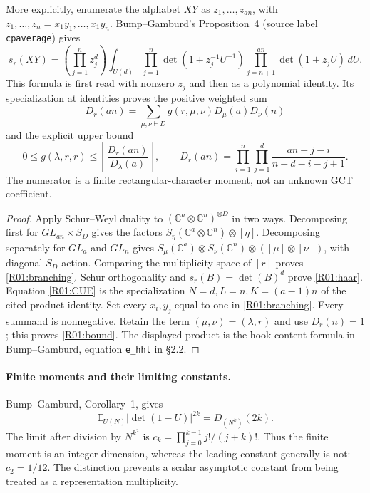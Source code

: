 \documentclass[11pt,a4paper]{article}
\theoremstyle{definition}\newtheorem{definition}{Definition}
\begin{document}
More explicitly, enumerate the alphabet $XY$ as $z_1,\ldots,z_{an}$, with
$z_1,\ldots,z_n=x_1y_1,\ldots,x_1y_n$. Bump--Gamburd's Proposition~4
(source label \nolinkurl{cpaverage}) gives
\begin{equation}\label{R01:CUE}
 s_r(XY)=\left(\prod_{j=1}^n z_j^d\right)
 \int_{U(d)}\prod_{j=1}^n\det(1+z_j^{-1}U^{-1})
 \prod_{j=n+1}^{an}\det(1+z_jU)\,dU.
\end{equation}
This formula is first read with nonzero $z_j$ and then as a polynomial identity.
Its specialization at identities proves the positive weighted sum
\begin{equation}\label{R01:dimension}
 D_r(an)=\sum_{\mu,\nu\vdash D}
 g(r,\mu,\nu)D_\mu(a)D_\nu(n)
\end{equation}
and the explicit upper bound
\begin{equation}\label{R01:bound}
 0\leq g(\lambda,r,r)\leq
 \left\lfloor\frac{D_r(an)}{D_\lambda(a)}\right\rfloor,
 \qquad
 D_r(an)=\prod_{i=1}^{n}\prod_{j=1}^{d}
 \frac{an+j-i}{n+d-i-j+1}.
\end{equation}
The numerator is a finite rectangular-character moment, not an unknown GCT
coefficient.

\begin{proof}
Apply Schur--Weyl duality to $(\mathbb C^a\otimes\mathbb C^n)^{\otimes D}$
in two ways. Decomposing first for $GL_{an}\times S_D$ gives the factors
$S_\eta(\mathbb C^a\otimes\mathbb C^n)\otimes[\eta]$.
Decomposing separately for $GL_a$ and $GL_n$ gives
$S_\mu(\mathbb C^a)\otimes S_\nu(\mathbb C^n)\otimes
([\mu]\otimes[\nu])$, with diagonal $S_D$ action. Comparing the multiplicity
space of $[r]$ proves \eqref{R01:branching}. Schur orthogonality and
$s_r(B)=\det(B)^d$ prove \eqref{R01:haar}. Equation \eqref{R01:CUE} is the
specialization $N=d,L=n,K=(a-1)n$ of the cited product identity.
Set every $x_i,y_j$ equal to one in \eqref{R01:branching}. Every summand is
nonnegative. Retain the term $(\mu,\nu)=(\lambda,r)$ and use
$D_r(n)=1$; this proves \eqref{R01:bound}. The displayed product is the
hook-content formula in Bump--Gamburd, equation \nolinkurl{e_hhl} in \S2.2.
\end{proof}

\paragraph{Finite moments and their limiting constants.}
Bump--Gamburd, Corollary~1, gives
\[
 \mathbb E_{U(N)}|\det(1-U)|^{2k}=D_{(N^k)}(2k).
\]
The limit after division by $N^{k^2}$ is
$c_k=\prod_{j=0}^{k-1}j!/(j+k)!$. Thus the finite moment is an integer
dimension, whereas the leading constant generally is not: $c_2=1/12$.
The distinction prevents a scalar asymptotic constant from being treated as
a representation multiplicity.
\end{document}
